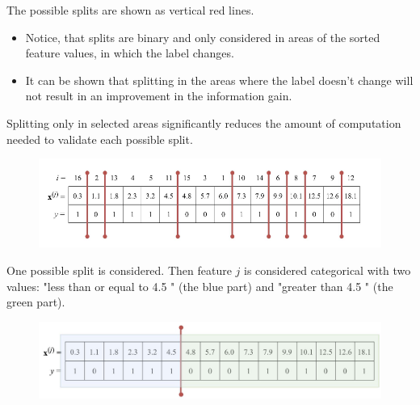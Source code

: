 \documentclass[9pt,dvipsnames]{beamer}
\begin{document}
	\begin{frame}
		The possible splits are shown as vertical red lines. 
		\begin{itemize}
			\item Notice, that splits are binary and only considered in areas of the sorted feature values, in which the label changes.
			\item It can be shown that splitting in the areas where the label doesn't change will not result in an improvement in the information gain.
		\end{itemize}
		 Splitting only in selected areas significantly reduces the amount of computation needed to validate each possible split.
		 \begin{figure}
		 	\centering
		 	\includegraphics[width=\textwidth]{imgs/algorithm_6.png}
		 \end{figure}
	\end{frame}
	
	\begin{frame}
		One possible split is considered. Then feature $j$ is considered categorical with two values: "less than or equal to 4.5 " (the blue part) and "greater than 4.5 " (the green part).
		\begin{figure}
			\centering
			\includegraphics[width=\textwidth]{imgs/algorithm_7.jpg}
		\end{figure}
	\end{frame}
	
\end{document}
